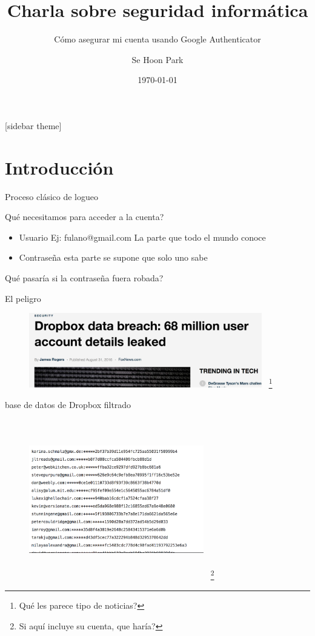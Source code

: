 \documentclass[11pt]{beamer}
\title[]{Charla sobre seguridad inform\'atica}
\subtitle[]{C\'omo asegurar mi cuenta usando Google Authenticator}
\author[]{Se Hoon Park}
\date[]{\today}
\let\oldfootnote\footnote
\renewcommand\footnote[1][]{\oldfootnote[frame,#1]}
\begin{document}
\begin{frame}[plain]
\titlepage
\end{frame}
[sidebar theme]



\section{Introducci\'on}
\begin{frame}{Proceso cl\'asico de logueo}\footnotesize
  \begin{block}{Qu\'e necesitamos para acceder a la cuenta?}
    \begin{itemize}
      \item<2-> Usuario Ej: fulano@gmail.com La parte que todo el mundo conoce
      \item<3-> Contrase\~na  esta parte se supone que solo uno sabe
    \end{itemize}
    \pause
    \pause
    \pause
    \color[rgb]{1,0,0} Qu\'e pasar\'ia si la contrase\~na fuera robada?
  \end{block}
\end{frame}
\begin{frame}{El peligro}
  \begin{figure}[ht]
    \begin{center}
      \includegraphics[width=4in]{noticia-dropbox.png}
	~\footnote{Qu\'e les parece tipo de noticias?}
    \end{center}
  \end{figure}
\end{frame}
\begin{frame}{base de datos de Dropbox filtrado}
  \begin{figure}[ht]
    \begin{center}
      \includegraphics[height=2.75in, width=3in]{dropbox-database.png}
	~\footnote{Si aqu\'i incluye su cuenta, que har\'ia?}
    \end{center}
  \end{figure}
\end{frame}
\end{document}
